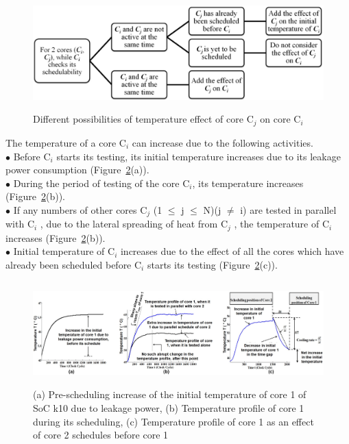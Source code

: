 \documentclass[conference]{IEEEtran}
\begin{document}
\begin{figure}
		{\includegraphics[width=\columnwidth]{1.png}}
		\caption{Different possibilities of temperature effect of core C$_{j}$ on core C$_{i}$}
        \label{fig: 1}
\end{figure}


	\par
	The temperature of a core C$_{i}$ can increase due to the
following activities.\\
\hspace*{0.5cm}$\bullet$ Before C$_{i}$ starts its testing, its initial temperature increases due
to its leakage power consumption (Figure~\ref{fig: 2}(a)).\\
\hspace*{0.5cm}$\bullet$ During the period of testing of the core C$_{i}$, its temperature
increases (Figure~\ref{fig: 2}(b)).\\
\hspace*{0.5cm}$\bullet$ If any numbers of other cores C$_{j}$ (1 $\leq$ j $\leq$ N)(j $\neq$ i) are tested
in parallel with C$_{i}$ , due to the lateral spreading of heat from C$_{j}$ ,
the temperature of C$_{i}$ increases (Figure~\ref{fig: 2}(b)). \\
\hspace*{0.5cm}$\bullet$ Initial temperature of C$_{i}$ increases due to the effect of all the
cores which have already been scheduled before C$_{i}$ starts its
testing (Figure~\ref{fig: 2}(c)).\\

\begin{figure}
  \includegraphics[width=\textwidth,height=4cm]{2.png}
  \caption{(a) Pre-scheduling increase of the initial temperature of core 1 of SoC k10 due to leakage power, (b) Temperature profile of core 1 during its
scheduling, (c) Temperature profile of core 1 as an effect of core 2 schedules before core 1}
\label{fig: 2}
\end{figure}
 
\end{document}
